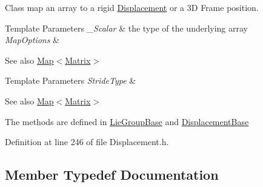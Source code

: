 Class map an array to a rigid \hyperlink{class_displacement}{Displacement} or a 3D Frame position. 


\begin{DoxyTemplParams}{Template Parameters}
{\em \+\_\+\+Scalar} & the type of the underlying array \\
\hline
{\em Map\+Options} & \\
\hline
\end{DoxyTemplParams}
\begin{DoxySeeAlso}{See also}
\hyperlink{class_map_3_01_displacement_3_01___scalar_01_4_00_01_map_options_00_01_stride_type_01_4_a7355e77dc9b91bd8cb68f20847318f0f}{Map$<$\+Matrix$>$} 
\end{DoxySeeAlso}

\begin{DoxyTemplParams}{Template Parameters}
{\em Stride\+Type} & \\
\hline
\end{DoxyTemplParams}
\begin{DoxySeeAlso}{See also}
\hyperlink{class_map_3_01_displacement_3_01___scalar_01_4_00_01_map_options_00_01_stride_type_01_4_a7355e77dc9b91bd8cb68f20847318f0f}{Map$<$\+Matrix$>$}

The methods are defined in \hyperlink{class_lie_group_base}{Lie\+Group\+Base} and \hyperlink{class_displacement_base}{Displacement\+Base} 
\end{DoxySeeAlso}


Definition at line 246 of file Displacement.\+h.



\subsection{Member Typedef Documentation}
\hypertarget{class_map_3_01_displacement_3_01___scalar_01_4_00_01_map_options_00_01_stride_type_01_4_a1df1fc84e68f902341a4d48037cf82dd}{}\label{class_map_3_01_displacement_3_01___scalar_01_4_00_01_map_options_00_01_stride_type_01_4_a1df1fc84e68f902341a4d48037cf82dd} 
